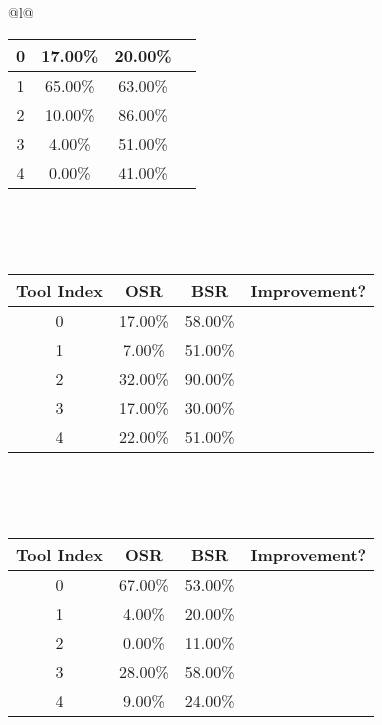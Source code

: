 \begin{longtable}{@{}l@{}}
\begin{minipage}{\textwidth}
\begin{tabular}{|c|c|c|c|}
0 & 17.00\% & 20.00\% & \textcolor{green}{\ding{51}} \\ \hline
1 & 65.00\% & 63.00\% & \textcolor{red}{\ding{55}} \\ \hline
2 & 10.00\% & 86.00\% & \textcolor{green}{\ding{51}} \\ \hline
3 & 4.00\% & 51.00\% & \textcolor{green}{\ding{51}} \\ \hline
4 & 0.00\% & 41.00\% & \textcolor{green}{\ding{51}} \\ \hline
\end{tabular}
\end{minipage}\\[2ex]
\begin{minipage}{\textwidth}
\centering\vspace{2ex}
\\[0.8ex]
\begin{tabular}{|c|c|c|c|} \hline
\textbf{Tool Index} & \textbf{OSR} & \textbf{ BSR} & \textbf{Improvement?} \\ \hline
0 & 17.00\% & 58.00\% & \textcolor{green}{\ding{51}} \\ \hline
1 & 7.00\% & 51.00\% & \textcolor{green}{\ding{51}} \\ \hline
2 & 32.00\% & 90.00\% & \textcolor{green}{\ding{51}} \\ \hline
3 & 17.00\% & 30.00\% & \textcolor{green}{\ding{51}} \\ \hline
4 & 22.00\% & 51.00\% & \textcolor{green}{\ding{51}} \\ \hline
\end{tabular}
\end{minipage}\\[2ex]
\begin{minipage}{\textwidth}
\centering\vspace{2ex}
\\[0.8ex]
\begin{tabular}{|c|c|c|c|} \hline
\textbf{Tool Index} & \textbf{OSR} & \textbf{ BSR} & \textbf{Improvement?} \\ \hline
0 & 67.00\% & 53.00\% & \textcolor{red}{\ding{55}} \\ \hline
1 & 4.00\% & 20.00\% & \textcolor{green}{\ding{51}} \\ \hline
2 & 0.00\% & 11.00\% & \textcolor{green}{\ding{51}} \\ \hline
3 & 28.00\% & 58.00\% & \textcolor{green}{\ding{51}} \\ \hline
4 & 9.00\% & 24.00\% & \textcolor{green}{\ding{51}} \\ \hline

\end{tabular}
\end{minipage}
\end{longtable}
